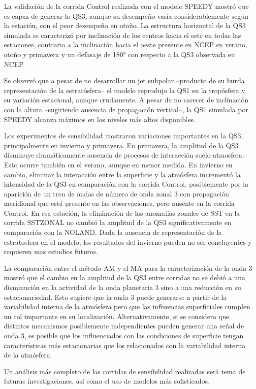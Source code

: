 \documentclass[spanish,a4paper,12pt,oneside]{book}
\begin{document}
La validación de la corrida Control realizada con el modelo SPEEDY
mostró que es capaz de generar la QS3, aunque su desempeño varía
considerablemente según la estación, con el peor desempeño en otoño. La
estructura horizontal de la QS3 simulada se caracterizó por inclinación
de los centros hacia el este en todas las estaciones, contrario a la
inclinación hacia el oeste presente en NCEP en verano, otoño y primavera
y un defasaje de 180° con respecto a la QS3 observada en NCEP.

Se observó que a pesar de no desarrollar un jet subpolar --producto de
su burda representación de la estratósfera-- el modelo reprodujo la QS1
en la tropósfera y su variación estacional, aunque crudamente. A pesar
de no carecer de inclinación con la altura --sugiriendo ausencia de
propagación vertical--, la QS1 simulada por SPEEDY alcanza máximos en
los niveles más altos disponibles.

Los experimentos de sensibilidad mostraron variaciones importantes en la
QS3, principalmente en invierno y primavera. En primavera, la amplitud
de la QS3 disminuye dramáticamente ausencia de procesos de interacción
suelo-atmosfera. Esto ocurre también en el verano, aunque en menor
medida. En invierno en cambio, eliminar la interacción entre la
superficie y la atmósfera incrementó la intensidad de la QS3 en
comparación con la corrida Control, posiblemente por la aparición de un
tren de ondas de número de onda zonal 3 con propagación meridional que
está presente en las observaciones, pero ausente en la corrida Control.
En esa estación, la eliminación de las anomalías zonales de SST en la
corrida SSTZONAL no cambió la amplitud de la QS3 significativamente en
comparación con la NOLAND. Dada la ausencia de representación de la
estratosfera en el modelo, los resultados del invierno pueden no ser
concluyentes y requieren mas estudios futuros.

La comparación entre el método AM y el MA para la caracterización de la
onda 3 mostró que el cambio en la amplitud de la QS3 entre corridas no
se debió a una disminución en la actividad de la onda planetaria 3 sino
a una reducción en su estacionariedad. Esto sugiere que la onda 3 puede
generarse a partir de la variabilidad interna de la atmósfera pero que
las influencias superficiales cumplen un rol importante en su
localización. Alternativamente, si se considera que distintos mecanismos
posiblemente independientes pueden generar una señal de onda 3, es
posible que los influenciados con las condiciones de superficie tengan
características más estacionarias que los relacionados con la
variabilidad interna de la atmósfera.

Un análisis más completo de las corridas de sensibilidad realizadas será
tema de futuras investigaciones, así como el uso de modelos más
sofisticados.

\renewcommand\bibname{Referencias}

\end{document}
